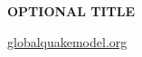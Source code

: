 \begingroup
\thispagestyle{empty}
\begin{center}
\vspace*{9cm}
\par\bfseries\fontsize{35}{35}\sffamily\selectfont
\textcolor{gembrown}{OPTIONAL TITLE}\par
\vspace*{9cm}
\par\normalfont\fontsize{15}{15}\sffamily\selectfont
\href{http://globalquakemodel.org/}
     {\textcolor{oqblue}{globalquakemodel.org}}
\end{center}
\endgroup